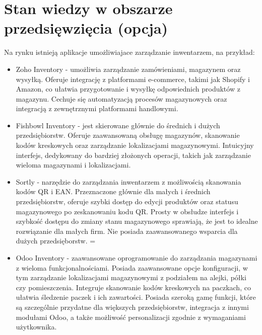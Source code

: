 \documentclass[../main.tex]{subfiles}
\begin{document}
\section{Stan wiedzy w obszarze przedsięwzięcia (opcja)}

Na rynku istnieją aplikacje umożliwiajace zarządzanie inwentarzem, na przykład: 
\begin{itemize}
    \item Zoho Inventory - umożliwia zarządzanie zamówieniami, magazynem oraz wysyłką. Oferuje integrację z platformami e-commerce, takimi jak Shopify i Amazon, co ułatwia przygotowanie i wysyłkę odpowiednich produktów z magazynu. Cechuje się automatyzacją procesów magazynowych oraz integracją z zewnętrznymi platformami handlowymi.
    \item Fishbowl Inventory - jest skierowane głównie do średnich i dużych przedsiębiorstw. Oferuje zaawansowaną obsługę magazynów, skanowanie kodów kreskowych oraz zarządzanie lokalizacjami magazynowymi. Intuicyjny interfejs, dedykowany do bardziej złożonych operacji, takich jak zarządzanie wieloma magazynami i lokalizacjami.
    \item Sortly - narzędzie do zarządzania inwentarzem z możliwością skanowania kodów QR i EAN. Przeznaczone głównie dla małych i średnich przedsiębiorstw, oferuje szybki dostęp do edycji produktów oraz statusu magazynowego po zeskanowaniu kodu QR. Prosty w obsłudze interfejs i szybkość dostępu do zmiany stanu magazynowego sprawiają, że jest to idealne rozwiązanie dla małych firm. Nie posiada zaawansowanego wsparcia dla dużych przedsięborstw. =
    \item Odoo Inventory - zaawansowane oprogramowanie do zarządzania magazynami z wieloma funkcjonalnościami. Posiada zaawansowane opcje konfiguracji, w tym zarządzanie lokalizacjami magazynowymi z podziałem na alejki, półki czy pomieszczenia. Integruje skanowanie kodów kreskowych na paczkach, co ułatwia śledzenie paczek i ich zawartości. Posiada szeroką gamę funkcji, które są szczególnie przydatne dla większych przedsiębiorstw, integracja z innymi modułami Odoo, a także możliwość personalizacji zgodnie z wymaganiami użytkownika.
\end{itemize}
\end{document}
